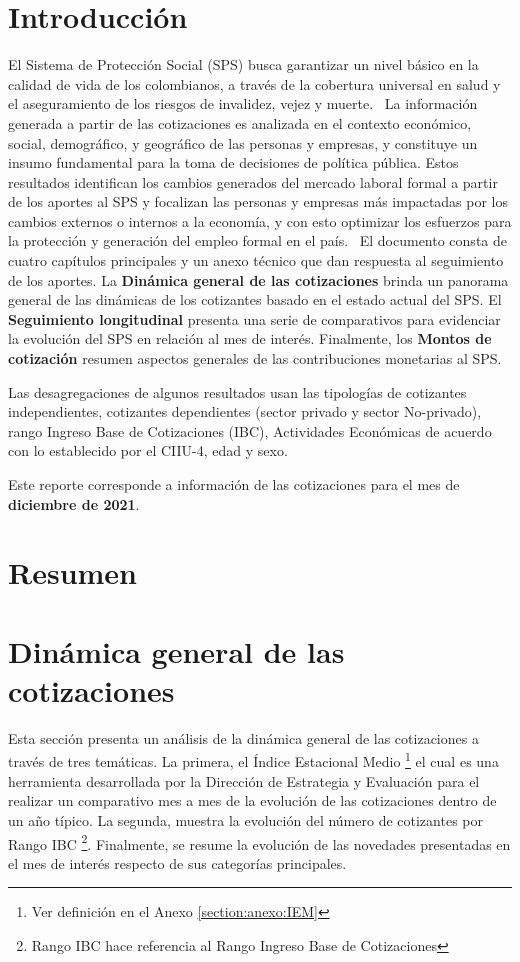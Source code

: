 \section{Introducción}

El Sistema de Protección Social (SPS) busca garantizar un nivel básico en la calidad de vida de los colombianos, a través de la cobertura universal en salud y el aseguramiento de los riesgos de invalidez, vejez y muerte. 
\
La información generada a partir de las cotizaciones es analizada en el contexto económico, social, demográfico, y geográfico de las personas y empresas, y constituye un insumo fundamental para la toma de decisiones de política pública.  Estos resultados identifican los cambios generados del mercado laboral formal a partir de los aportes al SPS y focalizan las personas y empresas más impactadas por los cambios externos o internos a la economía, y con esto optimizar los esfuerzos para la protección y generación del empleo formal en el país. 
\
El documento consta de cuatro capítulos principales y un anexo técnico que dan respuesta al seguimiento de los aportes. La \textbf{Dinámica general de las cotizaciones} brinda un panorama general de las dinámicas de los cotizantes basado en el estado actual del SPS. El \textbf{Seguimiento longitudinal} presenta  una serie de comparativos para evidenciar la evolución del SPS en relación al mes de interés. Finalmente, los \textbf{Montos de cotización} resumen aspectos generales de las contribuciones monetarias al SPS. 

Las desagregaciones de algunos resultados usan las tipologías de cotizantes independientes, cotizantes dependientes (sector privado y sector No-privado), rango Ingreso Base de Cotizaciones (IBC), Actividades Económicas de acuerdo con lo establecido por el CIIU-4, edad y sexo. 


Este reporte corresponde a información de las cotizaciones para el mes de \textbf{diciembre de 2021}.
\section{Resumen}


\newpage 
\section{Dinámica general de las cotizaciones}

Esta sección presenta un análisis de la dinámica general de las cotizaciones a través de tres temáticas. La primera, el Índice Estacional Medio \footnote{Ver definición en el Anexo \ref{section:anexo:IEM}} el cual es una herramienta desarrollada por la Dirección de Estrategia y Evaluación para el realizar un comparativo mes a mes de la evolución de las cotizaciones dentro de un año típico. La segunda, muestra la evolución del número de cotizantes por Rango IBC \footnote{Rango IBC hace referencia al Rango Ingreso Base de Cotizaciones}. Finalmente, se resume la evolución de las novedades presentadas en el mes de interés respecto de sus categorías principales. 

